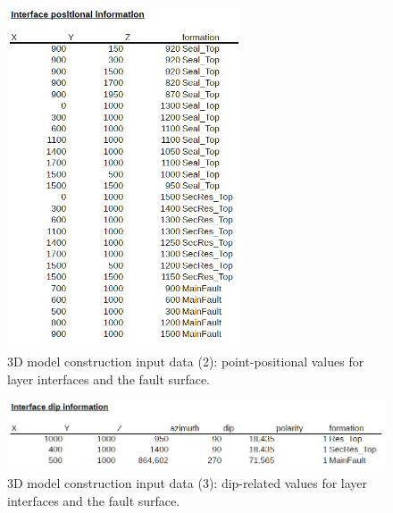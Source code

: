 \documentclass[a4paper,11pt]{MScThesis}
\begin{document}
	\begin{figure}[h]
		\centering
		\includegraphics[width=0.62\textwidth]{Figures/Appendix/CSV_input2}
		\caption{3D model construction input data (2): point-positional values for layer interfaces and the fault surface.}\label{fig:CSV_input2}
	\end{figure}

	\begin{figure}[h]
		\centering
		\includegraphics[width=1\textwidth]{Figures/Appendix/CSV_input3}
		\caption{3D model construction input data (3): dip-related values for layer interfaces and the fault surface.}\label{fig:CSV_input3}
	\end{figure}
\end{document}
